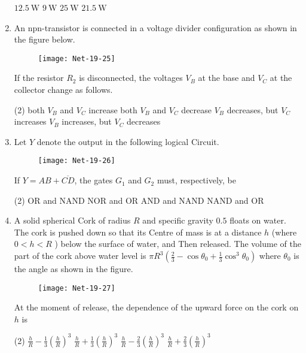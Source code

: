 \begin{enumerate}
\begin{tasks}
	\task[\textbf{a.}]$12.5 \mathrm{~W}$
	\task[\textbf{b.}]$9 \mathrm{~W}$
	\task[\textbf{c.}]$25 \mathrm{~W}$
	\task[\textbf{d.}]$21.5 \mathrm{~W}$ 
\end{tasks}
\item  An npn-transistor is connected in a voltage divider configuration as shown in the figure below.
\begin{figure}[H]
	\centering
	\texttt{[image: Net-19-25]}
\end{figure}
If the resistor $R_{2}$ is disconnected, the voltages $V_{B}$ at the base and $V_{C}$ at the collector change as follows.
 \begin{tasks}(2)
	\task[\textbf{a.}]both $V_{B}$ and $V_{C}$ increase
	\task[\textbf{b.}]both $V_{B}$ and $V_{C}$ decrease
	\task[\textbf{c.}]$V_{B}$ decreases, but $V_{C}$ increases
	\task[\textbf{d.}]$V_{B}$ increases, but $V_{C}$ decreases
\end{tasks}
\item  Let $Y$ denote the output in the following logical Circuit.
\begin{figure}[H]
	\centering
	\texttt{[image: Net-19-26]}
\end{figure}
If $Y=A B+\overline{C D}$, the gates $G_{1}$ and $G_{2}$ must, respectively, be
 \begin{tasks}(2)
	\task[\textbf{a.}]OR and NAND
	\task[\textbf{b.}]NOR and $\mathrm{OR}$
	\task[\textbf{c.}] AND and NAND
	\task[\textbf{d.}]  NAND and OR
\end{tasks}
\item  A solid spherical Cork of radius $R$ and specific gravity $0.5$ floats on water. The cork is pushed down so that its Centre of mass is at a distance $h$ (where $0<h<R$ ) below the surface of water, and Then released. The volume of the part of the cork above water level is $\pi R^{3}\left(\frac{2}{3}-\cos \theta_{0}+\frac{1}{3} \cos ^{3} \theta_{0}\right)$ where $\theta_{0}$ is the angle as shown in the figure.
\begin{figure}[H]
	\centering
	\texttt{[image: Net-19-27]}
\end{figure}
At the moment of release, the dependence of the upward force on the cork on $h$ is
 \begin{tasks}(2)
	\task[\textbf{a.}]$\frac{h}{R}-\frac{1}{3}\left(\frac{h}{R}\right)^{3}$
	\task[\textbf{b.}]$\frac{h}{R}+\frac{1}{3}\left(\frac{h}{R}\right)^{3}$
	\task[\textbf{c.}]$\frac{h}{R}-\frac{2}{3}\left(\frac{h}{R}\right)^{3}$
	\task[\textbf{d.}] $\frac{h}{R}+\frac{2}{3}\left(\frac{h}{R}\right)^{3}$

\end{tasks}
\end{enumerate}
